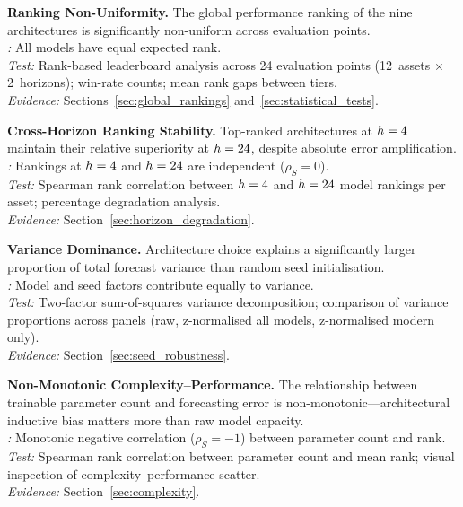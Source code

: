\begin{description}[leftmargin=1.2cm, labelwidth=1cm, labelsep=0.2cm, font=\bfseries]
  \item[H1.] \textbf{Ranking Non-Uniformity.}  The global performance ranking of the nine architectures is significantly non-uniform across evaluation points.\\
  \emph{\Hzero:} All models have equal expected rank.\\
  \emph{Test:} Rank-based leaderboard analysis across 24 evaluation points (12~assets $\times$ 2~horizons); win-rate counts; mean rank gaps between tiers.\\
  \emph{Evidence:} Sections~\ref{sec:global_rankings} and~\ref{sec:statistical_tests}.

  \item[H2.] \textbf{Cross-Horizon Ranking Stability.}  Top-ranked architectures at $h=4$ maintain their relative superiority at $h=24$, despite absolute error amplification.\\
  \emph{\Hzero:} Rankings at $h=4$ and $h=24$ are independent ($\rho_S = 0$).\\
  \emph{Test:} Spearman rank correlation between $h=4$ and $h=24$ model rankings per asset; percentage degradation analysis.\\
  \emph{Evidence:} Section~\ref{sec:horizon_degradation}.

  \item[H3.] \textbf{Variance Dominance.}  Architecture choice explains a significantly larger proportion of total forecast variance than random seed initialisation.\\
  \emph{\Hzero:} Model and seed factors contribute equally to variance.\\
  \emph{Test:} Two-factor sum-of-squares variance decomposition; comparison of variance proportions across panels (raw, z-normalised all models, z-normalised modern only).\\
  \emph{Evidence:} Section~\ref{sec:seed_robustness}.

  \item[H4.] \textbf{Non-Monotonic Complexity--Performance.}  The relationship between trainable parameter count and forecasting error is non-monotonic---architectural inductive bias matters more than raw model capacity.\\
  \emph{\Hzero:} Monotonic negative correlation ($\rho_S = -1$) between parameter count and \rmse rank.\\
  \emph{Test:} Spearman rank correlation between parameter count and mean \rmse rank; visual inspection of complexity--performance scatter.\\
  \emph{Evidence:} Section~\ref{sec:complexity}.
\end{description}

